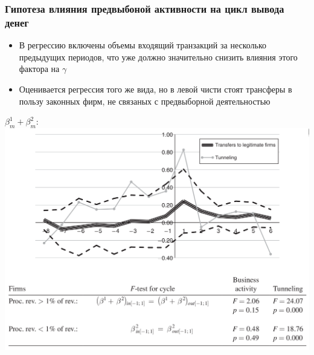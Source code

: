 
\begin{frame}
\frametitle{Гипотеза влияния предвыбоной активности на цикл вывода денег}
\begin{itemize}
	\item В регрессию включены объемы входящий транзакций за несколько предыдущих периодов, что уже должно значительно снизить влияния этого фактора на $\gamma$
	\item Оценивается регрессия того же вида, но в левой чисти стоят трансферы в пользу законных фирм, не связаных с предвыборной деятельностью
\end{itemize}
\end{frame}

\begin{frame}
$\beta^1_m + \beta^2_m$:
\includegraphics[scale=0.25]{images/legit_trans}
\end{frame}